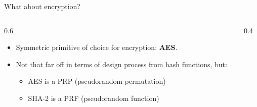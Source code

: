 \documentclass[aspectratio=169, lualatex, handout]{beamer}
\begin{document}
	\begin{frame}{What about encryption?}
		\begin{columns}[c]
			\begin{column}{0.6\textwidth}
				\begin{itemize}
					\item Symmetric primitive of choice for encryption: \textbf{AES}.

					\item Not that far off in terms of design process from hash functions,
						but:
						\begin{itemize}
							\item AES is a PRP (pseudorandom permutation)

							\item SHA-2 is a PRF (pseudorandom function)
						\end{itemize}
				\end{itemize}
			\end{column}

			\begin{column}{0.4\textwidth}
			\end{column}
		\end{columns}
	\end{frame}
\end{document}
